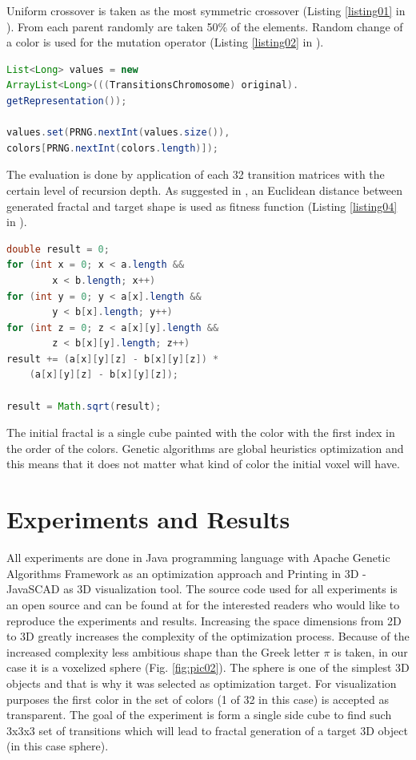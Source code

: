 \documentclass{llncs}
\begin{document}
Uniform crossover is taken as the most symmetric crossover (Listing \ref{listing01} in \cite{balabanov01}). From each parent randomly are taken 50\% of the elements. Random change of a color is used for the mutation operator (Listing \ref{listing02} in \cite{balabanov01}). 

\begin{lstlisting}[language=Java, caption=Color mutation of a single voxel., label=listing02]
List<Long> values = new 
ArrayList<Long>(((TransitionsChromosome) original).
getRepresentation());

values.set(PRNG.nextInt(values.size()), 
colors[PRNG.nextInt(colors.length)]);
\end{lstlisting}

The evaluation is done by application of each 32 transition matrices with the certain level of recursion depth. As suggested in \cite{guerin01}, an Euclidean distance between generated fractal and target shape is used as fitness function (Listing \ref{listing04} in \cite{balabanov01}). 

\begin{lstlisting}[language=Java, caption=Euclidean distance between voxels., label=listing04]
double result = 0;
for (int x = 0; x < a.length && 
		x < b.length; x++)
for (int y = 0; y < a[x].length && 
		y < b[x].length; y++)
for (int z = 0; z < a[x][y].length && 
		z < b[x][y].length; z++)
result += (a[x][y][z] - b[x][y][z]) * 
	(a[x][y][z] - b[x][y][z]);

result = Math.sqrt(result);
\end{lstlisting}

The initial fractal is a single cube painted with the color with the first index in the order of the colors. Genetic algorithms are global heuristics optimization and this means that it does not matter what kind of color the initial voxel will have. 

\section{Experiments and Results} \label{Experiments and Results}

All experiments are done in Java programming language with Apache Genetic Algorithms Framework \cite{apache01} as an optimization approach and Printing in 3D - JavaSCAD \cite{printing01} as 3D visualization tool. The source code used for all experiments is an open source and can be found at \cite{balabanov01} for the interested readers who would like to reproduce the experiments and results. Increasing the space dimensions from 2D to 3D greatly increases the complexity of the optimization process. Because of the increased complexity less ambitious shape than the Greek letter $\pi$ is taken, in our case it is a voxelized sphere (Fig. \ref{fig:pic02}). The sphere is one of the simplest 3D objects and that is why it was selected as optimization target. For visualization purposes the first color in the set of colors (1 of 32 in this case) is accepted as transparent. The goal of the experiment is form a single side cube to find such 3x3x3 set of transitions which will lead to fractal generation of a target 3D object (in this case sphere).
\end{document}
